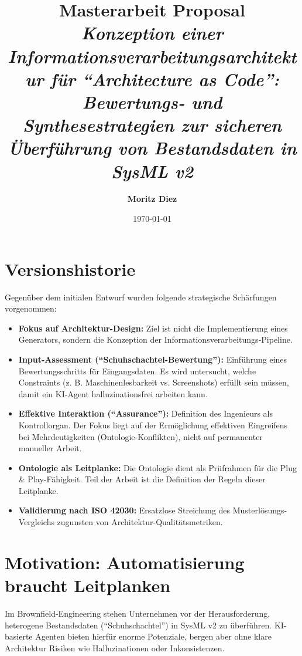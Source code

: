 \documentclass[12pt, a4paper]{article}
\title{\textbf{Masterarbeit Proposal} \\ \vspace{0.5cm} \large \textit{Konzeption einer Informationsverarbeitungsarchitektur für \enquote{Architecture as Code}: Bewertungs- und Synthesestrategien zur sicheren Überführung von Bestandsdaten in SysML v2}}
\author{\textbf{Moritz Diez}}
\date{\today}
\begin{document}
\maketitle

\section*{Versionshistorie}
\begin{tcolorbox}[colback=gray!10!white, colframe=gray!50!black, title=\textbf{Update zu Version 0.1 (Architektur \& Assurance)}]
    Gegenüber dem initialen Entwurf wurden folgende strategische Schärfungen vorgenommen:
    \begin{itemize}[leftmargin=*, label=\textbullet]
        \item \textbf{Fokus auf Architektur-Design:} Ziel ist nicht die Implementierung eines Generators, sondern die Konzeption der Informationsverarbeitungs-Pipeline.
        \item \textbf{Input-Assessment (\enquote{Schuhschachtel-Bewertung}):} Einführung eines Bewertungsschritts für Eingangsdaten. Es wird untersucht, welche Constraints (z. B. Maschinenlesbarkeit vs. Screenshots) erfüllt sein müssen, damit ein KI-Agent halluzinationsfrei arbeiten kann.
        \item \textbf{Effektive Interaktion (\enquote{Assurance}):} Definition des Ingenieurs als Kontrollorgan. Der Fokus liegt auf der Ermöglichung effektiven Eingreifens bei Mehrdeutigkeiten (Ontologie-Konflikten), nicht auf permanenter manueller Arbeit.
        \item \textbf{Ontologie als Leitplanke:} Die Ontologie dient als Prüfrahmen für die Plug \& Play-Fähigkeit. Teil der Arbeit ist die Definition der Regeln dieser Leitplanke.
        \item \textbf{Validierung nach ISO 42030:} Ersatzlose Streichung des Musterlösungs-Vergleichs zugunsten von Architektur-Qualitätsmetriken.
    \end{itemize}
\end{tcolorbox}
\vspace{0.5cm}
\newpage
\section{Motivation: Automatisierung braucht Leitplanken}

Im Brownfield-Engineering stehen Unternehmen vor der Herausforderung, heterogene Bestandsdaten (\enquote{Schuhschachtel}) in SysML v2 zu überführen. KI-basierte Agenten bieten hierfür enorme Potenziale, bergen aber ohne klare Architektur Risiken wie Halluzinationen oder Inkonsistenzen.
\end{document}
